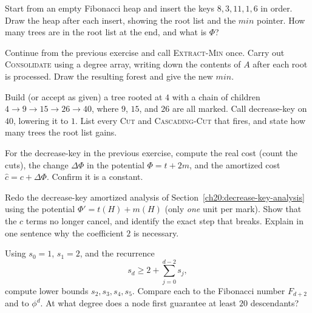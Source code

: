\begin{exercise}
Start from an empty Fibonacci heap and insert the keys $8, 3, 11, 1, 6$ in order.
Draw the heap after each insert, showing the root list and the $\mathit{min}$
pointer. How many trees are in the root list at the end, and what is $\Phi$?
\end{exercise}

\begin{exercise}
Continue from the previous exercise and call \textsc{Extract-Min} once. Carry out
\textsc{Consolidate} using a degree array, writing down the contents of $A$ after
each root is processed. Draw the resulting forest and give the new $\mathit{min}$.
\end{exercise}

\begin{exercise}
Build (or accept as given) a tree rooted at $4$ with a chain of children
$4 \to 9 \to 15 \to 26 \to 40$, where $9$, $15$, and $26$ are all marked. Call
decrease-key on $40$, lowering it to $1$. List every \textsc{Cut} and
\textsc{Cascading-Cut} that fires, and state how many trees the root list gains.
\end{exercise}

\begin{exercise}
For the decrease-key in the previous exercise, compute the real cost (count the
cuts), the change $\Delta\Phi$ in the potential $\Phi = t + 2m$, and the amortized
cost $\hat c = c + \Delta\Phi$. Confirm it is a constant.
\end{exercise}

\begin{exercise}
Redo the decrease-key amortized analysis of
Section~\ref{ch20:decrease-key-analysis} using the potential
$\Phi' = t(H) + m(H)$ (only \emph{one} unit per mark). Show that the $c$ terms no
longer cancel, and identify the exact step that breaks. Explain in one sentence why
the coefficient $2$ is necessary.
\end{exercise}

\begin{exercise}
Using $s_0 = 1$, $s_1 = 2$, and the recurrence
\[
  s_d \ge 2 + \sum_{j=0}^{d-2} s_j,
\]
compute lower
bounds $s_2, s_3, s_4, s_5$. Compare each to the Fibonacci number $F_{d+2}$ and to
$\phi^d$. At what degree does a node first guarantee at least $20$ descendants?
\end{exercise}

